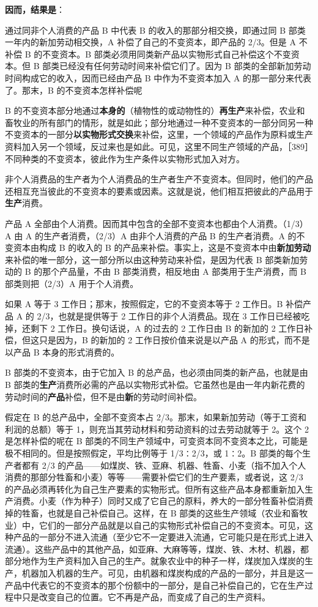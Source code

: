 \textbf{因而，结果是}：

通过同非个人消费的产品 B 中代表 B 的收入的那部分相交换，即通过同 B 部类一年内的新加劳动相交换，A 补偿了自己的不变资本，即产品的 2/3。但是 A 不补偿 B 的不变资本。B 部类必须用同类新产品以实物形式自己补偿这个不变资本。但 B 部类已经没有任何劳动时间来补偿它们了。因为 B 部类的全部新加劳动时间构成它的收入，因而已经由产品 B 中作为不变资本加入 A 的那一部分来代表了。那末，B 的不变资本怎样补偿呢

B 的不变资本部分地通过\textbf{本身的}（植物性的或动物性的）\textbf{再生产}来补偿，农业和畜牧业的所有部门的情形，就是如此；部分地通过一种不变资本的一部分同另一种不变资本的一部分\textbf{以实物形式交换}来补偿，这里，一个领域的产品作为原料或生产资料加入另一个领域，反过来也是如此。可见，这里不同生产领域的产品，［389］不同种类的不变资本，彼此作为生产条件以实物形式加入对方。

非个人消费品的生产者为个人消费品的生产者生产不变资本。但同时，他们的产品还相互充当彼此的不变资本的要素或因素。这就是说，他们相互把彼此的产品用于\textbf{生产}消费。

产品 A 全部由个人消费。因而其中包含的全部不变资本也都由个人消费。（1/3）A 由 A 的生产者消费，（2/3）A 由非个人消费的产品 B 的生产者消费。A 的不变资本由构成 B 的收入的 B 的产品来补偿。事实上，这是不变资本中由\textbf{新加劳动}来补偿的唯一部分，这一部分所以由这种劳动来补偿，是因为代表 B 部类新加劳动的 B 的那个产品量，不由 B 部类消费，相反地由 A 部类用于生产消费，而 B 部类则把（2/3）A 用于个人消费。

如果 A 等于 3 工作日；那末，按照假定，它的不变资本等于 2 工作日。B 补偿产品 A 的 2/3，也就是提供等于 2 工作日的非个人消费品。现在 3 工作日已经被吃掉，还剩下 2 工作日。换句话说，A 的过去的 2 工作日由 B 的新加的 2 工作日补偿，但这只是因为，B 的新加的 2 工作日按价值来说是以产品 A 的形式，而不是以产品 B 本身的形式消费的。

B 部类的不变资本，由于它加入 B 的总产品，也必须由同类的新产品，也就是由 B 部类的\textbf{生产}消费所必需的产品以实物形式补偿。它虽然也是由一年内新花费的劳动时间的\textbf{产品}补偿，但不是由\textbf{新}的劳动时间补偿。

假定在 B 的总产品中，全部不变资本占 2/3。那末，如果新加劳动（等于工资和利润的总额）等于 1，则充当其劳动材料和劳动资料的过去劳动就等于 2。这个 2 是怎样补偿的呢在 B 部类的不同生产领域中，可变资本同不变资本之比，可能是极不相同的。但是按照假定，平均比例等于 1/3∶2/3，或 1∶2。B 部类的每个生产者都有 2/3 的产品——如煤炭、铁、亚麻、机器、牲畜、小麦（指不加入个人消费的那部分牲畜和小麦）等等——需要补偿它们的生产要素，或者说，这 2/3 的产品必须再转化为自己生产要素的实物形式。但所有这些产品本身都重新加入生产消费。小麦（作为种子）同时又成了它自己的原料，养大的一部分牲畜补偿消费掉的牲畜，也就是自己补偿自己。这样，在 B 部类的这些生产领域（农业和畜牧业）中，它们的一部分产品就是以自己的实物形式补偿自己的不变资本。可见，这种产品的一部分不进入流通（至少它不一定要进入流通，它可能只是在形式上进入流通）。这些产品中的其他产品，如亚麻、大麻等等，煤炭、铁、木材、机器，都部分地作为生产资料加入自己的生产。就象农业中的种子一样，煤炭加入煤炭的生产，机器加入机器的生产。可见，由机器和煤炭构成的产品的一部分，并且是这一产品中代表它的不变资本的那个份额中的一部分，是自己补偿自己的，它在生产过程中只是改变自己的位置。它不再是产品，而变成了自己的生产资料。

